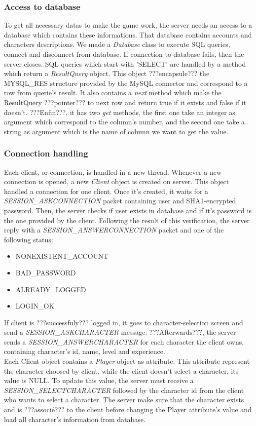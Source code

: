 \documentclass{scrreprt}
\begin{document}
		\subsubsection{Access to database}
		To get all necessary datas to make the game work, the server needs an access to a database which contains these informations. That database contains accounts and characters descriptions. We made a \emph{Database} class to execute SQL queries, connect and disconnect from database. If connection to database fails, then the server closes. SQL queries which start with 'SELECT' are handled by a method which return a \emph{ResultQuery} object. This object ???encapsule??? the MYSQL\_RES structure provided by the MySQL connector and correspond to a row from querie's result. It also contains a \emph{next} method which make the ResultQuery ???pointer??? to next row and return true if it exists and false if it doesn't. ???Enfin???, it has two \emph{get} methods, the first one take an integer as argument which correspond to the column's number, and the second one take a string as argument which is the name of column we want to get the value.
		\subsubsection{Connection handling}
		Each client, or connection, is handled in a new thread. Whenever a new connection is opened, a new \emph{Client} object is created on server. This object handled a connection for one client. Once it's created, it waits for a \emph{SESSION\_ASKCONNECTION} packet containing user and SHA1-encrypted password. Then, the server checks if user exists in database and if it's password is the one provided by the client. Following the result of this verification, the server reply with a \emph{SESSION\_ANSWERCONNECTION} packet and one of the following status:
		\begin{itemize}
		\item{NONEXISTENT\_ACCOUNT}
		\item{BAD\_PASSWORD}
		\item{ALREADY\_LOGGED}
		\item{LOGIN\_OK}
		\end{itemize}

		If client is ???successfuly??? logged in, it goes to character-selection screen and send a \emph{SESSION\_ASKCHARACTER} message. ???Afterwards???, the server sends a \emph{SESSION\_ANSWERCHARACTER} for each character the client owns, containing character's id, name, level and experience.\\
		Each Client object contains a \emph{Player} object as attribute. This attribute represent the character choosed by client, while the client doesn't select a character, its value is NULL. To update this value, the server must receive a \emph{SESSION\_SELECTCHARACTER} followed by the character id from the client who wants to select a character. The server make sure that the character exists and is ???associé??? to the client before changing the Player attribute's value and load all character's information from database.
\end{document}
